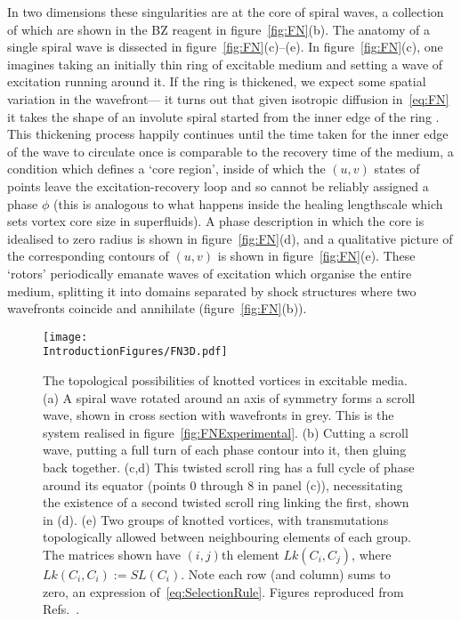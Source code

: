 In two dimensions these singularities are at the core of spiral waves, a collection of which are shown in the BZ reagent in figure~\ref{fig:FN}(b). The anatomy of a single spiral wave is dissected in figure~\ref{fig:FN}(c)--(e). In figure~\ref{fig:FN}(c), one imagines taking an initially thin ring of excitable medium and setting a wave of excitation running around it. If the ring is thickened, we expect some spatial variation in the wavefront--- it turns out that given isotropic diffusion in~\eqref{eq:FN} it takes the shape of an involute spiral started from the inner edge of the ring \citep{WinfreeBook}. This thickening process happily continues until the time taken for the inner edge of the wave to circulate once is comparable to the recovery time of the medium, a condition which defines a `core region', inside of which the $(u,v)$ states of points leave the excitation-recovery loop and so cannot be reliably assigned a phase $\phi$ (this is analogous to what happens inside the healing lengthscale which sets vortex core size in superfluids). A phase description in which the core is idealised to zero radius is shown in figure~\ref{fig:FN}(d), and a qualitative picture of the corresponding contours of $(u,v)$ is shown in figure~\ref{fig:FN}(e). These `rotors' periodically emanate waves of excitation which organise the entire medium, splitting it into domains separated by shock structures where two wavefronts coincide and annihilate (figure~\ref{fig:FN}(b)).
\begin{figure}[htbp]
\centering
\texttt{[image: \\IntroductionFigures/FN3D.pdf]}
\caption{The topological possibilities of knotted vortices in excitable media. (a) A spiral wave rotated around an axis of symmetry forms a scroll wave, shown in cross section with wavefronts in grey. This is the system realised in figure~\ref{fig:FNExperimental}. (b) Cutting a scroll wave, putting a full turn of each phase contour into it, then gluing back together. (c,d) This twisted scroll ring has a full cycle of phase around its equator (points $0$ through $8$ in panel (c)), necessitating the existence of a second twisted scroll ring linking the first, shown in (d). (e) Two groups of knotted vortices, with transmutations topologically allowed between neighbouring elements of each group. The matrices shown have $(i,j)$th element $Lk(C_i,C_j)$, where $Lk(C_i,C_i):= SL(C_i)$. Note each row (and column) sums to zero, an expression of~\eqref{eq:SelectionRule}. Figures reproduced from Refs.~\citep{Winfree1983, Winfree1983b, Winfree1990}.}
\label{fig:FN3D}
\end{figure}

